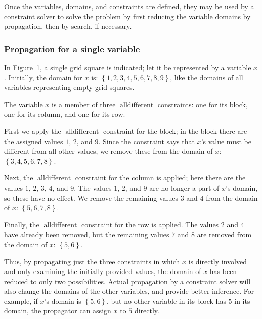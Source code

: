 \documentclass[a4paper,10pt,twoside,openright]{book}
\newcommand{\set}[1]{\left\{#1\right\}}
\DeclareMathOperator{\alldifferent}{alldifferent}
\begin{document}
Once the variables, domains, and constraints are defined, they may be used by a constraint solver to solve the problem by first reducing the variable domains by propagation, then by search, if necessary.

\subsubsection{Propagation for a single variable}
\begin{figure}
    \centering
    
    \label{fig:sudokusquare}
\end{figure}

In Figure~\ref{fig:sudokusquare}, a single grid square is indicated; let it be represented
by a variable $x$. 
Initially,
the domain for $x$ is: $\set{1,2,3,4,5,6,7,8,9}$,
like the domains of all variables representing empty grid squares.

The variable $x$ is a member of three $\alldifferent$ constraints: one for its block, one for its column, and one for its row.

First we apply the $\alldifferent$ constraint for the block; in the block there are the assigned values $1$, $2$, and $9$. Since the constraint says that $x$'s value must be different from all other values, we remove these from the domain of $x$: $\set{3,4,5,6,7,8}$.

Next, the $\alldifferent$ constraint for the column is applied; here there are the values $1$, $2$, $3$, $4$, and $9$. The values $1$, $2$, and $9$ are no longer a part of $x$'s domain, so these have no effect. We remove the remaining values $3$ and $4$ from the domain of $x$: $\set{5,6,7,8}$.

Finally, the $\alldifferent$ constraint for the row is applied. The values $2$ and $4$ have already been removed, but the remaining values $7$ and $8$ are removed from the domain of $x$: $\set{5,6}$.

Thus, by propagating just the three constraints in which $x$ is directly involved and only examining the initially-provided values, the domain of $x$ has been reduced to only two possibilities. Actual propagation by a constraint solver will also change the domains of the other variables, and provide better inference. For example, if $x$'s domain is $\set{5,6}$, but no other variable in its block has $5$ in its domain, the propagator can assign $x$ to $5$ directly.  
\end{document}

